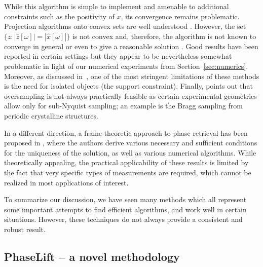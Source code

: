 \documentclass[11pt]{article}
\newcommand{\<}{\langle}
\renewcommand{\>}{\rangle}
\numberwithin{equation}{section}
\begin{document}
While this algorithm is simple to implement and amenable to additional
constraints such as the positivity of $x$, its convergence remains
problematic.  Projection algorithms onto convex sets are well
understood \cite{Bre65,GPR67,You87,BCL02}.  However, the set $\{z :
|\hat{z}[\omega]| = |\hat{x}[\omega]|\}$ is not convex and, therefore,
the algorithm is not known to converge in general or even to give a
reasonable solution \cite{LH87,BCL02,LBL02}.  Good results have been
reported in certain settings but they appear to be nevertheless
somewhat problematic in light of our numerical experiments from
Section~\ref{sec:numerics}.  Moreover, as discussed
in~\cite{Pfeiffer}, one of the most stringent limitations of these
methods is the need for isolated objects (the support constraint).
Finally, \cite{Mar08} points out that oversampling is not always
practically feasible as certain experimental geometries allow only for
sub-Nyquist sampling; an example is the Bragg sampling from periodic
crystalline structures.


In a different direction, a frame-theoretic approach to phase
retrieval has been proposed in \cite{BCE06,BBC09}, where the authors
derive various necessary and sufficient conditions for the uniqueness
of the solution, as well as various numerical algorithms.  While
theoretically appealing, the practical applicability of these results
is limited by the fact that very specific types of measurements are
required, which cannot be realized in most applications of interest.

To summarize our discussion, we have seen many methods which all
represent some important attempts to find efficient algorithms, and
work well in certain situations. However, these techniques do not
always provide a consistent and robust result. %

\subsection{PhaseLift -- a novel methodology}
\end{document}
